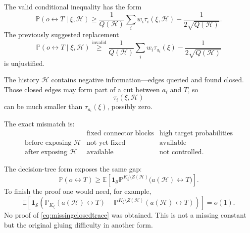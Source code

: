 \documentclass[11pt]{article}
\newcommand{\one}{\mathbf 1}
\begin{document}
The valid conditional inequality has the form
\[
\boxed{
\mathbb P(o\leftrightarrow T\mid\xi,\mathcal H)
\ge
\frac1{Q(\mathcal H)}
\sum_iw_i\tau_i(\xi,\mathcal H)
-\frac1{2\sqrt{Q(\mathcal H)}}.
}
\tag{11.1}\label{eq:validconditional}
\]
The previously suggested replacement
\[
\mathbb P(o\leftrightarrow T\mid\xi,\mathcal H)
\stackrel{\mathrm{invalid}}{\ge}
\frac1{Q(\mathcal H)}
\sum_iw_i\tau_{a_i}(\xi)
-\frac1{2\sqrt{Q(\mathcal H)}}
\tag{11.2}\label{eq:invalidconditional}
\]
is unjustified.

The history \(\mathcal H\) contains negative information---edges queried and found closed. Those closed edges may form part of a cut between \(a_i\) and \(T\), so
\[
\tau_i(\xi,\mathcal H)
\]
can be much smaller than \(\tau_{a_i}(\xi)\), possibly zero.

The exact mismatch is:
\[
\begin{array}{c|c|c}
&\text{fixed connector blocks}&\text{high target probabilities}\\ \hline
\text{before exposing }\mathcal H&\text{not yet fixed}&\text{available}\\
\text{after exposing }\mathcal H&\text{available}&\text{not controlled}.
\end{array}
\]

The decision-tree form exposes the same gap:
\[
\mathbb P(o\leftrightarrow T)
\ge
\mathbb E\left[
\one_{\mathcal S}
\mathbb P^{K_\xi\setminus Z(\mathcal H)}
\bigl(a(\mathcal H)\leftrightarrow T\bigr)
\right].
\tag{11.3}
\]
To finish the proof one would need, for example,
\[
\boxed{
\mathbb E\left[
\one_{\mathcal S}
\left(
\mathbb P_{K_\xi}(a(\mathcal H)\leftrightarrow T)
-
\mathbb P^{K_\xi\setminus Z(\mathcal H)}
(a(\mathcal H)\leftrightarrow T)
\right)
\right]
=o(1).
}
\tag{11.4}\label{eq:missingclosedtrace}
\]
No proof of \eqref{eq:missingclosedtrace} was obtained. This is not a missing constant but the original gluing difficulty in another form.
\end{document}
